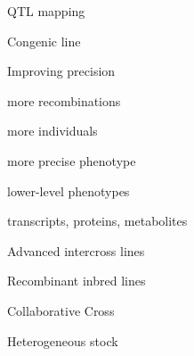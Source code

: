 \documentclass[12pt,t]{beamer}
\begin{document}
\begin{frame}[c]{QTL mapping}

\vspace{5mm}
\end{frame}



\begin{frame}[c]{Congenic line}


\end{frame}



\begin{frame}[c]{Improving precision}

  \vspace{-20mm}

  \bbi
\item more recombinations
\item more individuals
\item more precise phenotype
\item lower-level phenotypes
\bi
\item transcripts, proteins, metabolites
  \ei
  \ei

\end{frame}



\begin{frame}[c]{Advanced intercross lines}


\end{frame}


\begin{frame}[c]{Recombinant inbred lines}


\end{frame}


\begin{frame}[c]{Collaborative Cross}


\end{frame}



\begin{frame}[c]{Heterogeneous stock}

  \vspace{2mm}


\end{frame}
\end{document}

